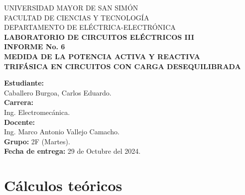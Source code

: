 \documentclass[letter,11pt]{article}
\begin{document}
\begin{titlepage}
    \begin{center}
        {\Large UNIVERSIDAD MAYOR DE SAN SIMÓN}\\
        \vspace*{0.15cm}
        {\large FACULTAD DE CIENCIAS Y TECNOLOGÍA}\\
        \vspace*{0.10cm}
        DEPARTAMENTO DE ELÉCTRICA-ELECTRÓNICA\\
        \vspace*{3.0cm}
        {\Large \textbf{LABORATORIO DE CIRCUITOS ELÉCTRICOS III}}\\
        \vspace*{0.3cm}
        {\Large \textbf{INFORME No. 6}}\\
        \vspace*{3.5cm}
        {\Large \textbf{MEDIDA DE LA POTENCIA ACTIVA Y REACTIVA\\
        TRIFÁSICA EN CIRCUITOS CON CARGA DESEQUILIBRADA}}\\
    \end{center}

    \vspace*{5.3cm}
    \leftskip=7.95cm
    \noindent
    \textbf{Estudiante:}\\
    Caballero Burgoa, Carlos Eduardo.\\
    \newline
    \textbf{Carrera:}\\
    Ing. Electromecánica.\\
    \newline
    \textbf{Docente:}\\
    Ing. Marco Antonio Vallejo Camacho.\\
    \newline
    \textbf{Grupo:} 2F (Martes).\\
\textbf{Fecha de entrega:} 29 de Octubre del 2024.\\
\end{titlepage}

\section{Cálculos teóricos}
\end{document}
